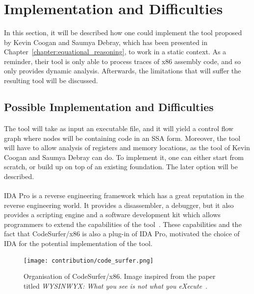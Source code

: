 \section{Implementation and Difficulties}
\paragraph{}
In this section, it will be described how one could implement the tool proposed by Kevin Coogan and Saumya Debray, which has been presented in Chapter~\ref{chapter:equational_reasoning}, to work in a static context. As a reminder, their tool is only able to process traces of x86 assembly code, and so only provides dynamic analysis. Afterwards, the limitations that will suffer the resulting tool will be discussed.

\subsection{Possible Implementation and Difficulties}
\paragraph{}
The tool will take as input an executable file, and it will yield a control flow graph where nodes will be containing code in an SSA form. Moreover, the tool will have to allow analysis of registers and memory locations, as the tool of Kevin Coogan and Saumya Debray can do. To implement it, one can either start from scratch, or build up on top of an existing foundation. The later option will be described.

\paragraph{}
IDA Pro is a reverse engineering framework which has a great reputation in the reverse engineering world. It provides a disassembler, a debugger, but it also provides a scripting engine and a software development kit which allows programmers to extend the capabilities of the tool~\cite{eagle2011ida}. These capabilities and the fact that CodeSurfer/x86 is also a plug-in of IDA Pro, motivated the choice of IDA for the potential implementation of the tool.

\begin{figure}[!htb]
	\centering
	\texttt{[image: contribution/code\_surfer.png]}
	\caption{Organisation of CodeSurfer/x86. Image inspired from the paper titled \textit{WYSINWYX: What you see is not what you eXecute}~\cite{balakrishnan2010wysinwyx}.}
	\label{fig:codesurfer}
\end{figure}

